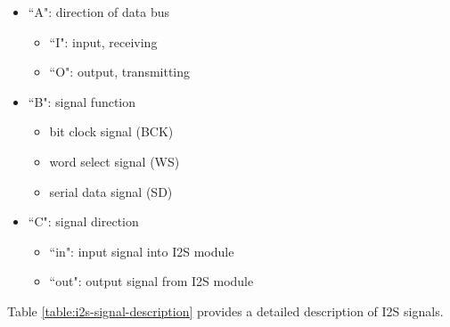 \documentclass[main\_\_CN.tex]{subfiles}
\begin{document}
\begin{itemize}
    \item ``A": direction of data bus
    \begin{itemize}
        \item ``I": input, receiving
        \item ``O": output, transmitting
    \end{itemize}
    \item ``B": signal function
    \begin{itemize}
        \item bit clock signal (BCK)
        \item word select signal (WS)
        \item serial data signal (SD)
    \end{itemize}
    \item ``C": signal direction
    \begin{itemize}
        \item ``in": input signal into I2S module
        \item ``out": output signal from I2S module
    \end{itemize}
\end{itemize}

Table \ref{table:i2s-signal-description} provides a detailed description of I2S signals.
\end{document}
